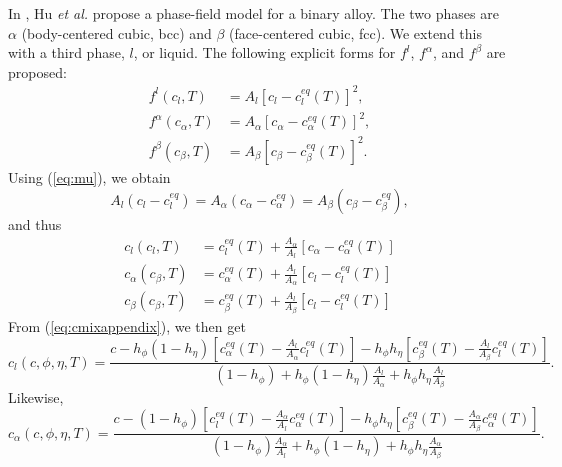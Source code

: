 In \cite{HuBaskesStanMitchell07}, Hu {\em et al.} propose a
phase-field model for a binary alloy.  The two phases are $\alpha$
(body-centered cubic, bcc) and $\beta$ (face-centered cubic, fcc).  We
extend this with a third phase, $l$, or liquid.  The following
explicit forms for $f^l$, $f^\alpha$, and $f^\beta$ are proposed:
%
\begin{align}
  f^l(c_l,T) &=
    A_l \left[ c_l - c_l^\mathit{eq}(T) \right]^2,
    \label{eq:fl} \\
  f^\alpha(c_\alpha,T) &=
    A_\alpha \left[ c_\alpha - c_\alpha^\mathit{eq}(T) \right]^2,
    \label{eq:falpha} \\
  f^\beta(c_\beta,T) &= 
    A_\beta \left[ c_\beta - c_\beta^\mathit{eq}(T) \right]^2.
    \label{eq:fbeta}
\end{align}
%
Using (\ref{eq:mu}), we obtain
%
\begin{equation}
  A_l ( c_l - c_l^\mathit{eq} ) = 
  A_\alpha ( c_\alpha - c_\alpha^\mathit{eq} ) = 
  A_\beta ( c_\beta - c_\beta^\mathit{eq} ),
\end{equation}
%
and thus
%
\begin{align}
  c_l(c_l,T) &=
    c_l^\mathit{eq}(T) + \frac{A_\alpha}{A_l}
    \left[ c_\alpha - c_\alpha^\mathit{eq}(T) \right]
  \\
  c_\alpha(c_\beta,T) &=
    c_\alpha^\mathit{eq}(T) + \frac{A_l}{A_\alpha}
    \left[ c_l - c_l^\mathit{eq}(T) \right]
  \\
  c_\beta(c_\beta,T) &=
    c_\beta^\mathit{eq}(T) + \frac{A_l}{A_\beta}
    \left[ c_l - c_l^\mathit{eq}(T) \right]
\end{align}
%
From (\ref{eq:cmixappendix}), we then get
%
\begin{equation}
  c_l(c,\phi,\eta,T) =
  \frac{ c -
    h_\phi (1 - h_\eta) \left[ c_\alpha^\mathit{eq}(T) - 
      \frac{A_l}{A_\alpha} c_l^\mathit{eq}(T) \right] -
    h_\phi h_\eta \left[ c_\beta^\mathit{eq}(T) -
      \frac{A_l}{A_\beta} c_l^\mathit{eq}(T) \right] }
    { (1 - h_\phi) +
      h_\phi (1 - h_\eta) \frac{A_l}{A_\alpha} +
      h_\phi h_\eta \frac{A_l}{A_\beta} }.
\label{eq:cl}
\end{equation}
%
Likewise,
%
\begin{equation}
  c_\alpha(c,\phi,\eta,T) =
  \frac{ c -
    (1 - h_\phi) \left[ c_l^\mathit{eq}(T) - 
      \frac{A_\alpha}{A_l} c_\alpha^\mathit{eq}(T) \right] -
    h_\phi h_\eta \left[ c_\beta^\mathit{eq}(T) -
      \frac{A_\alpha}{A_\beta} c_\alpha^\mathit{eq}(T) \right] }
    { (1 - h_\phi) \frac{A_\alpha}{A_l} +
      h_\phi (1 - h_\eta) +
      h_\phi h_\eta \frac{A_\alpha}{A_\beta} }.
\label{eq:calpha}
\end{equation}
